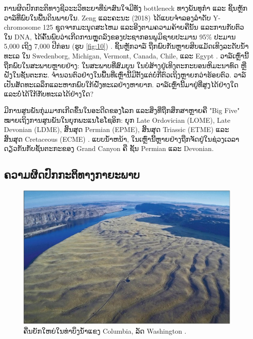 \documentclass[10pt,twocolumn,letterpaper]{article}
\begin{document}
ການຜິດປົກກະຕິທາງຊີວະະວິທະຍາທີ່ນ່າສົນໃຈມີທັງ bottleneck ທາງພັນທຸກຳ ແລະ ຊິ້ນຫຼັກວາລ໌ທີ່ພົບໃນພື້ນດິນພາຍໃນ. Zeng ແລະຄະນະ (2018) ໄດ້ແບບຈຳລອງລຳດັບ Y-chromosome 125 ຊຸດຈາກມະນຸດສະໄຫມ ແລະອີງຕາມຄວາມຄ້າຍຄືນັ້ນ ແລະການກັບຕົວໃນ DNA, ໄດ້ຄົ້ນພົບວ່າເກີດການຫຼຸດລົງຂອງປະຊາກອນພູມິຊາຍປະມານ 95\% ປະມານ 5,000 ເຖິງ 7,000 ປີກ່ອນ (ຮູບ \ref{fig:10}) \cite{62}. ຊິ້ນຫຼັກວາລ໌ ຖືກພົບກັນຫຼາຍສິບແມັດເທິງລະດັບນ້ຳທະເລ ໃນ Swedenborg, Michigan, Vermont, Canada, Chile, ແລະ Egypt \cite{63,64,65,66}. ວາລ໌ເຫຼົ່ານີ້ຖືກພົບໃນສະພາບຫຼາຍຢ່າງ: ໃນສະພາບທີ່ສົມບູນ ໃນບໍສ້າງຢູ່ເທິງຕະກະບອນຫິມະນາທົດ ຫຼື ຝັງໃນຊັ້ນຕະກະ. ຈຳນວນຕົວຢ່າງໃນພື້ນທີ່ເຫຼົ່ານີ້ມີຕັ້ງແຕ່ບໍ່ກີ່ຕົວເຖິງຫຼາຍກວ່າຮ້ອຍຕົວ.  ວາລ໌ເປັນສັດທະເລລຶກແລະຫາກພົບໃກ້ຝັ່ງທະເລຢ່າງຫາຍາກ. ວາລ໌ເຫຼົ່ານີ້ມາຢູ່ທີ່ສູງໄດ້ຢ່າງໃດ ແລະບໍ່ໄດ້ໃກ້ກັບທະເລໄດ້ຢ່າງໃດ?

ມີການສູນພັນກຸ່ມມາກເກີດຂຶ້ນໃນອະດີດຂອງໂລກ ແລະສິ່ງທີ່ຖືກສຶກສາຫຼາຍຄື "Big Five" ໝາຍເຖິງການສູນພັນໃນຍຸກພະແນໂຣໂຊອິກ: ຍຸກ Late Ordovician (LOME), Late Devonian (LDME), ສິ້ນສຸດ Permian (EPME), ສິ້ນສຸດ Triassic (ETME) ແລະ ສິ້ນສຸດ Cretaceous (ECME) \cite{88,89}. ແບບນ້ຳຫນ້າ, ໃນເຫຼົ່ານີ້ຫຼາຍຢ່າງຖືກຈັດຢູ່ໃນຊ່ວງເວລາດຽວກັນກັບຊັ້ນຕະກະຂອງ Grand Canyon ຄື ຊັ້ນ Permian ແລະ Devonian.

\subsection{ຄວາມຜິດປົກກະຕິທາງກາຍະພາບ}

\begin{figure}[b]
\begin{center}
   \includegraphics[width=1\linewidth]{columbia.jpg}
\end{center}
   \caption{ຄື່ນຍັກໃຫຍ່ໃນທ່າບຶງນ້ໍາແຂງ Columbia, ລັດ Washington \cite{80}.}
\label{fig:11}
\label{fig:onecol}
\end{figure}
\end{document}
